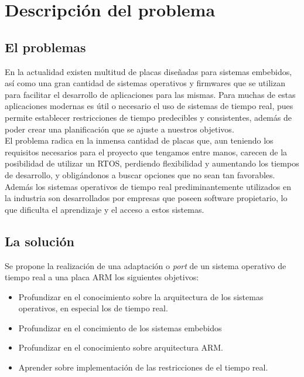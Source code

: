 \chapter{Descripción del problema}
\section{El problemas}
En la actualidad existen multitud de placas diseñadas para sistemas embebidos, así como una gran cantidad de sistemas operativos y firmwares que se utilizan para facilitar el desarrollo de aplicaciones para las mismas.
Para muchas de estas aplicaciones modernas es útil o necesario el uso de sistemas de tiempo real, pues permite establecer restricciones de tiempo predecibles y consistentes, además de poder crear una planificación que se ajuste a nuestros objetivos.\\

El problema radica en la inmensa cantidad de placas que, aun teniendo los requisitos necesarios para el proyecto que tengamos entre manos, carecen de la posibilidad de utilizar un RTOS, perdiendo flexibilidad y aumentando los tiempos de desarrollo, y obligándonos a buscar opciones que no sean tan favorables.
Además los sistemas operativos de tiempo real prediminantemente utilizados en la industria son desarrollados por empresas que poseen software propietario, lo que dificulta el aprendizaje y el acceso a estos sistemas.


\section{La solución}
Se propone la realización de una adaptación o \textit{port} de un sistema operativo de tiempo real a una placa ARM los siguientes objetivos:
\begin{itemize}
	\item Profundizar en el conocimiento sobre la arquitectura de los sistemas operativos, en especial los de tiempo real.
	\item Profundizar en el concimiento de los sistemas embebidos
	\item Profundizar en el conocimiento sobre arquitectura ARM.
	\item Aprender sobre implementación de las restricciones de el tiempo real.
\end{itemize}

